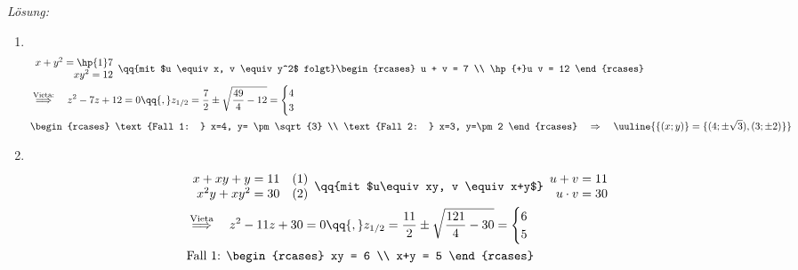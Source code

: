 \emph{Lösung:}
\begin{enumerate}[label={(\alph*)}]
    \item$~$\\[-1.4cm]
    \begin{align}
        &\begin{array}{r}
            x+y^2 = \hp{1}7\\ xy^2 = 12 
        \end{array} \qq{mit $u \equiv x, v \equiv y^2$ folgt} \begin{rcases}
            u + v = 7 \\
            \hp{+}u v = 12
        \end{rcases} \\
        &\overset{\text{Vieta:}}{\Longrightarrow}\quad z^2 - 7z +12 = 0 \qq{,} z_{1/2} = \frac{7}{2} \pm \sqrt{\frac{49}{4}-12} = \begin{cases}
            4\\3
        \end{cases} \\
        &\begin{rcases}
            \text{Fall 1: } x=4, y= \pm \sqrt{3}  \\
            \text{Fall 2: } x=3, y=\pm 2
        \end{rcases} \quad \Rightarrow \quad \uuline{\{(x;y)\} =\{(4;\pm\sqrt{3}),(3;\pm2)\}}
    \end{align}
    \item$~$\\[-1.4cm]
    \begin{align}
        &\begin{array}{r}
            x+xy+y =11 \quad (1) \\
            x^2y+xy^2 = 30 \quad (2)
        \end{array} \qq{mit $u\equiv xy, v \equiv x+y$} \begin{array}{r}
            u + v =11 \\
            u\cdot v = 30
        \end{array}\\
        & \overset{\text{Vieta}}{\Longrightarrow} \quad z^2 -11z +30 = 0 \qq{,} z_{1/2} = \frac{11}{2} \pm \sqrt{\frac{121}{4}-30} = \begin{cases}
            6 \\ 5
        \end{cases}\\
        &\text{Fall 1: } \begin{rcases}
            xy = 6 \\ x+y = 5   

\end{rcases}
\end{align}
\end{enumerate}
